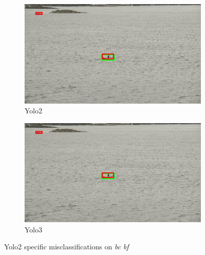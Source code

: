 \begin{figure}[h!]
\begin{subfigure}{.5\textwidth}
  \centering
  \includegraphics[width=0.9\linewidth]{results/case_buildings/yolo23/samemistake/yolo2/selected_08_07_frame13555.jpg}
  \caption{Yolo2}
\end{subfigure}%
\begin{subfigure}{.5\textwidth}
  \centering
  \includegraphics[width=.9\linewidth]{results/case_buildings/yolo23/samemistake/yolo2/selected_08_07_frame13555.jpg}
  \caption{Yolo3}
\end{subfigure}
\caption{Yolo2 specific misclassifications on \textit{bc} \textit{bf}}
\label{img:yolo2_misclas}


\end{figure}
